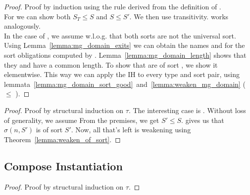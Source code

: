 \begin{theorem}
\end{theorem}
\begin{proof}
    Proof by induction using the rule derived from the definition of .\\
    For  we can show both \(S_T \leq S\) and \(S \leq S'\).
    We then use transitivity.
     works analogously.\\
    In the case of , we assume w.l.o.g. that both sorts are not the universal sort.
    Using Lemma~\ref{lemma:mg_domain_exits} we can obtain the names  and  for the sort obligations computed by .
    Lemma~\ref{lemma:mg_domain_length} shows that they and  have a common length.
    To show that  are of sort , we show it elementwise.
    This way we can apply the IH to every type and sort pair, using lemmata~\ref{lemma:mg_domain_sort_good}\ and~\ref{lemma:weaken_mg_domain} ( \(\leq\) ).
\end{proof}

\begin{corollary}
\end{corollary}
\begin{proof}
Proof by structural induction on \(\tau\).
The interesting case is .
Without loss of generality, we assume 
From the premises, we get \(S' \leq S\).
 gives us that \(\sigma (n, S')\) is of sort \(S'\).
Now, all that's left is weakening using Theorem~\ref{lemma:weaken_of_sort}.
\end{proof}

\subsection{Compose Instantiation}

\begin{lemma}
\end{lemma}
\begin{proof}
    Proof by structural induction on \(\tau\).
\end{proof}

\begin{quote}
\begin{isabelle}
     
\end{isabelle}
\end{quote}


